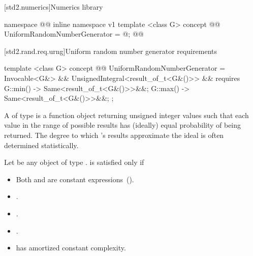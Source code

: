 [std2.numerics]{Numerics library}


\begin{codeblock}
namespace @@ { inline namespace v1 {
  template <class G>
  concept @@ UniformRandomNumberGenerator = @\seebelow@;
}}@\removed{\}\}}@
\end{codeblock}


[std2.rand.req.urng]{Uniform random number generator requirements}%
%

\begin{codeblock}
template <class G>
concept @@ UniformRandomNumberGenerator =
  Invocable<G&> &&
  UnsignedIntegral<result_of_t<G&()>> &&
  requires {
    { G::min() } -> Same<result_of_t<G&()>>&&;
    { G::max() } -> Same<result_of_t<G&()>>&&;
  };
\end{codeblock}

\pnum
A 
 of type 
is a function object
returning unsigned integer values
such that each value
in the range of possible results
has (ideally) equal probability
of being returned.
\enternote
 The degree to which 's results
 approximate the ideal
 is often determined statistically.
\exitnote

\pnum
Let  be any object of type .
 is satisfied only if

\begin{itemize}
\item Both  and  are constant expressions~().
\item {}.
\item {}.
\item {}.
\item {} has amortized constant complexity.
\end{itemize}

